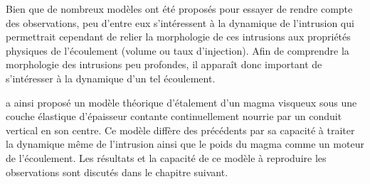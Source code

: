 Bien que de  nombreux modèles ont été proposés pour  essayer de rendre
compte des observations, peu d'entre  eux s'intéressent à la dynamique
de l'intrusion qui  permettrait cependant de relier  la morphologie de
ces  intrusions aux  propriétés physiques  de l'écoulement  (volume ou
taux d'injection).   Afin de comprendre la  morphologie des intrusions
peu  profondes,  il  apparaît  donc important  de  s'intéresser  à  la
dynamique d'un tel écoulement.

\citet{Michaut:2011kg} a ainsi proposé un modèle théorique d'étalement
d'un  magma visqueux  sous une  couche élastique  d'épaisseur contante
continuellement nourrie  par un  conduit vertical  en son  centre.  Ce
modèle diffère des  précédents par sa capacité à  traiter la dynamique
même de  l'intrusion ainsi que  le poids du  magma comme un  moteur de
l'écoulement. Les résultats  et la capacité de ce  modèle à reproduire
les observations sont discutés dans le chapitre suivant.

